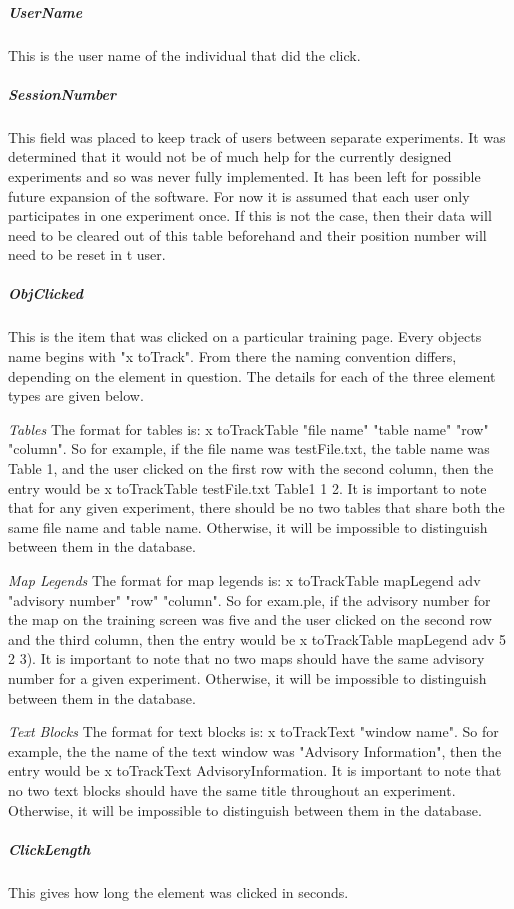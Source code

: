 \documentclass[article]{ij4uq}              %
\begin{document}
\subparagraph{UserName}
This is the user name of the individual that did the click.

\subparagraph{SessionNumber}
This field was placed to keep track of users between separate experiments. It was determined that it would not be of much help for the currently designed experiments and so was never fully implemented. It has been left for possible future expansion of the software. For now it is assumed that each user only participates in one experiment once. If this is not the case, then their data will need to be cleared out of this table beforehand and their position number will need to be reset in t user.

\subparagraph{ObjClicked}
This is the item that was clicked on a particular training page. Every objects name begins with "x toTrack". From there the naming convention differs, depending on the element in question. The details for each of the three element types are given below.
 
\emph{Tables}
The format for tables is: x toTrackTable "file name" "table name" "row" "column". So for example, if the file name was testFile.txt, the table name was Table 1, and the user clicked on the first row with the second column, then the entry would be x toTrackTable testFile.txt Table1 1 2. 
It is important to note that for any given experiment, there should be no two tables that share both the same file name and table name. Otherwise, it will be impossible to distinguish between them in the database.

\emph{Map Legends}
The format for map legends is: x toTrackTable mapLegend adv "advisory number" "row" "column". So for exam.ple, if the advisory number for the map on the training screen was five and the user clicked on the second row and the third column, then the entry would be x toTrackTable mapLegend adv 5 2 3). 
It is important to note that no two maps should have the same advisory number for a given experiment. Otherwise, it will be impossible to distinguish between them in the database.

\emph{Text Blocks}
The format for text blocks is: x toTrackText "window name". So for example, the the name of the text window was "Advisory Information", then the entry would be x toTrackText AdvisoryInformation. 
It is important to note that no two text blocks should have the same title throughout an experiment. Otherwise, it will be impossible to distinguish between them in the database.

\subparagraph{ClickLength}
This gives how long the element was clicked in seconds.
\end{document}
